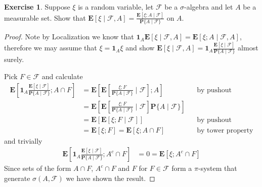\documentclass{amsbook}
\theoremstyle{definition}
\newtheorem{xca}{Exercise}
\theoremstyle{remark}
\newcommand{\expectation}[1]{\textbf{E}\left[#1\right]}
\newcommand{\cexpectationlong}[2]{\textbf{E}\left[ #2 \mid #1 \right]}
\newcommand{\cprobability}[2]{\textbf{P}\{#2 \mid #1\}}
\newcommand{\characteristic}[1]{\textbf{1}_{#1}}
\begin{document}
\begin{xca}Suppose $\xi$ is a random variable, let $\mathcal{F}$ be
  a $\sigma$-algebra and let $A$ be a measurable set.  Show that
  $\cexpectationlong{\mathcal{F},A}{\xi} =
  \frac{\cexpectationlong{\mathcal{F}}{\xi ;
      A}}{\cprobability{\mathcal{F}}{A}}$ on $A$.
\end{xca}
\begin{proof}
Note by Localization we know that $\characteristic{A}
\cexpectationlong{\mathcal{F},A}{\xi}  =
\cexpectationlong{\mathcal{F},A}{\xi;A}$, therefore we may assume that
$\xi = \characteristic{A} \xi$ and show
$\cexpectationlong{\mathcal{F},A}{\xi} = \characteristic{A}\frac{\cexpectationlong{\mathcal{F}}{\xi}}{\cprobability{\mathcal{F}}{A}}$ almost surely.

Pick $F \in \mathcal{F}$ and calculate
\begin{align*}
\expectation{\characteristic{A} \frac{\cexpectationlong{\mathcal{F}}
{\xi}}
{\cprobability{\mathcal{F}}{A}}
; A \cap F} 
&= \expectation{\cexpectationlong{\mathcal{F}}{\frac{\xi ; F}
{\cprobability{\mathcal{F}}{A}}} 
; A } & & \text{by pushout}\\
&= \expectation{\cexpectationlong{\mathcal{F}}{\frac{\xi ; F}
{\cprobability{\mathcal{F}}{A}}} 
\cprobability{\mathcal{F}}{A} } \\
&= \expectation{\cexpectationlong{\mathcal{F}}{\xi ; F}} & & \text{by
  pushout} \\
&= \expectation{\xi ; F} = 
\expectation{\xi ; A \cap F} & & \text{by tower property}
\end{align*}
and trivially
\begin{align*}
\expectation{\characteristic{A} \frac{\cexpectationlong{\mathcal{F}}
{\xi}}
{\cprobability{\mathcal{F}}{A}}
; A^c \cap F}  &= 0 = \expectation{\xi ; A^c \cap F}
\end{align*}
Since sets of the form $A \cap F$, $A^c \cap F$ and $F$ for $F \in
\mathcal{F}$ form a $\pi$-system that generate $\sigma(A,
\mathcal{F})$ we have shown the result.
\end{proof}
\end{document}
